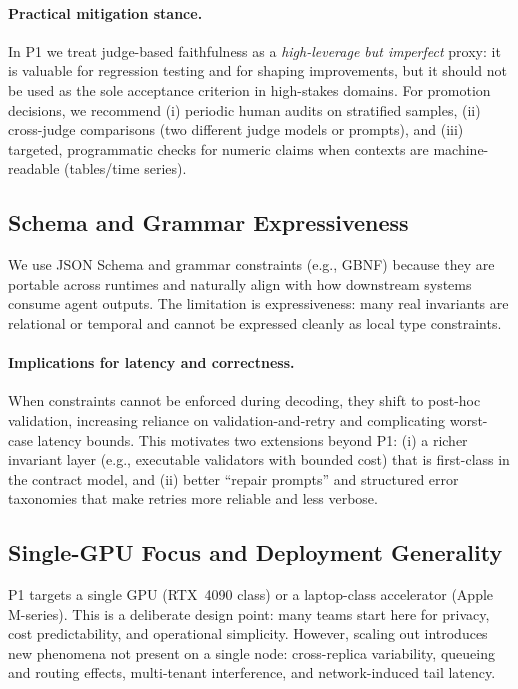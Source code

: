 \paragraph{Practical mitigation stance.}
In P1 we treat judge-based faithfulness as a \emph{high-leverage but imperfect} proxy:
it is valuable for regression testing and for shaping improvements, but it should not be used as the sole acceptance criterion in high-stakes domains.
For promotion decisions, we recommend (i) periodic human audits on stratified samples, (ii) cross-judge comparisons (two different judge models or prompts), and (iii) targeted, programmatic checks for numeric claims when contexts are machine-readable (tables/time series).

\subsection{Schema and Grammar Expressiveness}

We use JSON Schema and grammar constraints (e.g., GBNF) because they are portable across runtimes and naturally align with how downstream systems consume agent outputs.
The limitation is expressiveness: many real invariants are relational or temporal and cannot be expressed cleanly as local type constraints.

\paragraph{Implications for latency and correctness.}
When constraints cannot be enforced during decoding, they shift to post-hoc validation, increasing reliance on validation-and-retry and complicating worst-case latency bounds.
This motivates two extensions beyond P1:
(i) a richer invariant layer (e.g., executable validators with bounded cost) that is first-class in the contract model, and
(ii) better ``repair prompts'' and structured error taxonomies that make retries more reliable and less verbose.

\subsection{Single-GPU Focus and Deployment Generality}

P1 targets a single GPU (RTX~4090 class) or a laptop-class accelerator (Apple M-series).
This is a deliberate design point: many teams start here for privacy, cost predictability, and operational simplicity.
However, scaling out introduces new phenomena not present on a single node: cross-replica variability, queueing and routing effects, multi-tenant interference, and network-induced tail latency.

